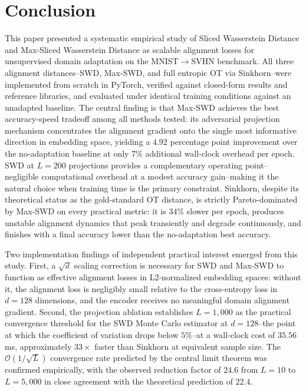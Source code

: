 \documentclass{article}
\begin{document}
	
	\section{Conclusion}
	
	This paper presented a systematic empirical study of Sliced Wasserstein Distance and Max-Sliced Wasserstein Distance as scalable alignment losses for unsupervised domain adaptation on the MNIST$\to$SVHN benchmark. All three alignment distances--SWD, Max-SWD, and full entropic OT via Sinkhorn--were implemented from scratch in PyTorch, verified against closed-form results and reference libraries, and evaluated under identical training conditions against an unadapted baseline. The central finding is that Max-SWD achieves the best accuracy-speed tradeoff among all methods tested: its adversarial projection mechanism concentrates the alignment gradient onto the single most informative direction in embedding space, yielding a $4.92$ percentage point improvement over the no-adaptation baseline at only $7\%$ additional wall-clock overhead per epoch. SWD at $L = 200$ projections provides a complementary operating point--negligible computational overhead at a modest accuracy gain--making it the natural choice when training time is the primary constraint. Sinkhorn, despite its theoretical status as the gold-standard OT distance, is strictly Pareto-dominated by Max-SWD on every practical metric: it is $34\%$ slower per epoch, produces unstable alignment dynamics that peak transiently and degrade continuously, and finishes with a final accuracy lower than the no-adaptation best accuracy.
	
	Two implementation findings of independent practical interest emerged from this study. First, a $\sqrt{d}$ scaling correction is necessary for SWD and Max-SWD to function as effective alignment losses in L2-normalized embedding spaces: without it, the alignment loss is negligibly small relative to the cross-entropy loss in $d = 128$ dimensions, and the encoder receives no meaningful domain alignment gradient. Second, the projection ablation establishes $L = 1{,}000$ as the practical convergence threshold for the SWD Monte Carlo estimator at $d = 128$--the point at which the coefficient of variation drops below $5\%$--at a wall-clock cost of $35.56$ ms, approximately $33\times$ faster than Sinkhorn at equivalent sample size. The $\mathcal{O}(1/\sqrt{L})$ convergence rate predicted by the central limit theorem was confirmed empirically, with the observed reduction factor of $24.6$ from $L = 10$ to $L = 5{,}000$ in close agreement with the theoretical prediction of $22.4$.
	
\end{document}
